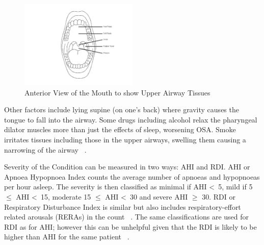 \begin{figure}[h]
\centering
\includegraphics[width=0.5\textwidth]{drawings/Anterior-View-Mouth}
\caption{Anterior View of the Mouth to show Upper Airway Tissues~\cite{anteriormouth}}
\label{fig:Anterior-View-Mouth}
\end{figure}

Other factors include lying supine (on one’s back) where gravity causes the tongue to fall into the airway. Some drugs including alcohol relax the pharyngeal dilator muscles more than just the effects of sleep, worsening OSA. Smoke irritates tissues including those in the upper airways, swelling them causing a narrowing of the airway ~\cite{apneosotherfactors}.

 Severity of the Condition can be measured in two ways: AHI and RDI. AHI or Apnoea Hypopnoea Index counts the average number of apnoeas and hypopnoeas per hour asleep. The severity is then classified as minimal if AHI \textless\ 5, mild if 5 $\leq$ AHI \textless\ 15, moderate 15 $\leq$ AHI \textless\ 30 and severe AHI $\geq$ 30. RDI or Respiratory Disturbance Index is similar but also includes respiratory-effort related arousals (RERAs) in the count ~\cite{AHI}. The same classifications are used for RDI as for AHI; however this can be unhelpful given that the RDI is likely to be higher than AHI for the same patient ~\cite{epstein2009clinical}.

